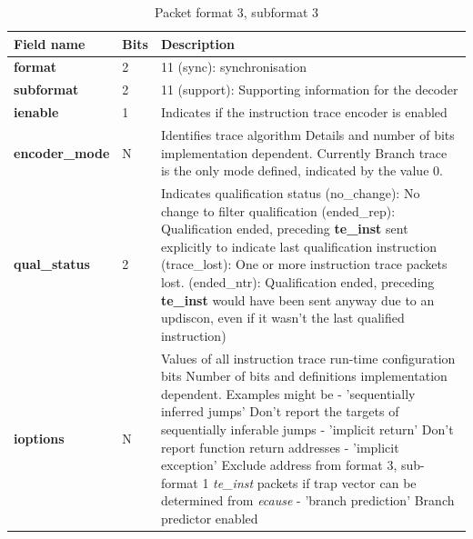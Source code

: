 \begin{table}[htp]
  \centering
  \caption{Packet format 3, subformat 3}
  \label{tab:te_inst3-3}
  \begin{tabulary}{\textwidth}{|l|p{35mm}|p{90mm}|}
    \hline
     {\bf Field name} & {\bf Bits} & {\bf Description} \\
     \hline
     \textbf{format} & 2 & 11 (sync): synchronisation\\
     \hline
     \textbf{subformat}  & 2 & 11 (support): Supporting information for the decoder \\
     \hline
     \textbf{ienable} & 1 & Indicates if the instruction trace encoder is enabled\\
     \hline
     \textbf{encoder\_mode} & N & Identifies trace algorithm\newline
       Details and number of bits implementation dependent.  Currently Branch trace is the only mode defined, indicated by the value 0.\\
     \hline
     \textbf{qual\_status} & 2 & Indicates qualification status (no\_change): No change to filter qualification  (ended\_rep): Qualification ended, preceding \textbf{te\_inst} sent explicitly to indicate last qualification instruction (trace\_lost): One or more instruction trace packets lost. (ended\_ntr): Qualification ended, preceding \textbf{te\_inst} would have been sent anyway due to an updiscon, even if it wasn't the last qualified instruction)\\
     \hline
     \textbf{ioptions} & N & Values of all instruction trace run-time configuration bits\newline
       Number of bits and definitions implementation dependent.  Examples might be\newline
       - 'sequentially inferred jumps' Don't report the targets of sequentially inferable jumps\newline
       - 'implicit return' Don't report function return addresses \newline
       - 'implicit exception' Exclude address from format 3, sub-format 1 \textit{te\_inst} packets if trap vector can be determined from \textit{ecause}\newline
       - 'branch prediction' Branch predictor enabled\newline

\end{tabulary}
\end{table}
